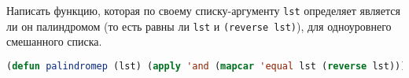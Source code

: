 Написать функцию, которая по своему списку-аргументу \verb|lst| определяет
является ли он палиндромом (то есть равны ли \verb|lst| и
\verb|(reverse lst)|), для одноуровнего смешанного списка.

\begin{lstlisting}[language=Lisp]
(defun palindromep (lst) (apply 'and (mapcar 'equal lst (reverse lst))))
\end{lstlisting}

